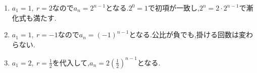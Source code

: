 \noindent{}\par\nobreak
\begin{enumerate}[label=(\arabic*),parsep=3pt,format=\bookitemlink{example-geometric-1}{solution}{problem}]
  \item $a_1=1,\ r=2$なので$a_n=2^{n-1}$となる.$2^0=1$で初項が一致し,$2^n=2\cdot2^{n-1}$で漸化式も満たす.
  \item $a_1=1,\ r=-1$なので$a_n=(-1)^{n-1}$となる.公比が負でも,掛ける回数は変わらない.
  \item $a_1=2,\ r=\frac12$を代入して,$a_n=2\left(\frac12\right)^{n-1}$となる.
\end{enumerate}

